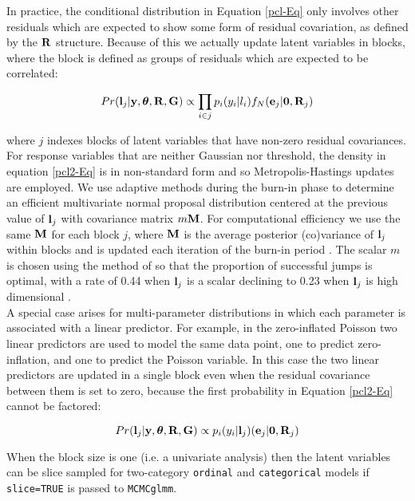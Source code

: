 \documentclass{article}
\begin{document}
In practice, the conditional distribution in Equation \ref{pcl-Eq} only involves other residuals which are expected to show some form of residual covariation, as defined by the ${\bf R}$ structure.  Because of this we actually update latent variables in blocks, where the block is defined as groups of residuals which are expected to be correlated:

\begin{equation}
Pr({\bf l}_{j}|{\bf y}, {\bm \theta}, {\bf R}, {\bf G}) \propto   \prod_{i \in j}{p}_{i}({y}_{i} | l_{i})f_{N}({\bf e}_{j}|{\bf 0}, {\bf R}_{j})
\label{pcl2-Eq}
\end{equation}

where $j$ indexes blocks of latent variables that have non-zero residual covariances. For response variables that are neither Gaussian nor threshold, the density in equation \ref{pcl2-Eq} is in non-standard form and so Metropolis-Hastings updates are employed. We use adaptive methods during the burn-in phase to determine an efficient multivariate normal proposal distribution centered at the previous value of ${\bf l}_{j}$ with covariance matrix $m{\bf M}$. For computational efficiency we use the same ${\bf M}$ for each block $j$, where ${\bf M}$ is the average posterior (co)variance of ${\bf l}_{j}$ within blocks and is updated each iteration of the burn-in period  \citet{Haario.2001}. The scalar $m$ is chosen using the method of \citet{Ovaskainen.2008} so that the proportion of successful jumps is optimal, with a rate of 0.44 when ${\bf l}_{j}$ is a scalar declining to 0.23 when ${\bf l}_{j}$ is high dimensional \citep{Gelman.2004}.\\

 A special case arises for multi-parameter distributions in which each parameter is  associated with a linear predictor. For example, in the zero-inflated Poisson two linear predictors are used to model the same data point, one to predict zero-inflation, and one to predict the Poisson variable. In this case the two linear predictors are updated in a single block even when the residual covariance between them is set to zero, because the first probability in Equation \ref{pcl2-Eq} cannot be factored:

\begin{equation}
Pr({\bf l}_{j}|{\bf y}, {\bm \theta}, {\bf R}, {\bf G}) \propto    {p}_{i}({y}_{i} | {\bf l}_{j})({\bf e}_{j}|{\bf 0}, {\bf R}_{j})
\label{pcl3-Eq}
\end{equation}
  
When the block size is one (i.e. a univariate analysis) then the latent variables can be slice sampled for two-category \texttt{ordinal} and \texttt{categorical} models if \texttt{slice=TRUE} is passed to \texttt{MCMCglmm}.\\
\end{document}
